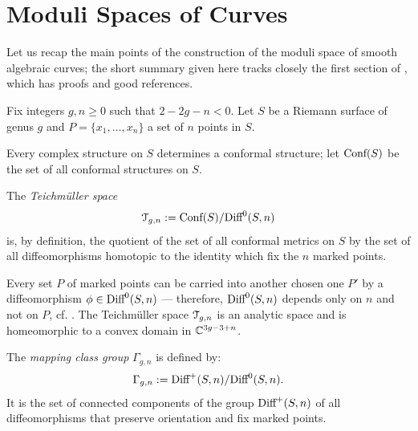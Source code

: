 \section{Moduli Spaces of Curves}
\label{sec:moduli-spaces}

Let us recap the main points of the construction of the moduli space
of smooth algebraic curves; the short summary given here tracks
closely the first section of \cite{looijenga;cellular-decomposition},
which has proofs and good references.

Fix integers $g,n\geq0$ such that $2 -2g - n < 0$. Let $S$ be a Riemann
surface of genus $g$ and $P = \{ x_1, \ldots, x_n \}$ a set of $n$ points
in $S$.

Every complex structure  on $S$ determines a conformal structure; let
$\text{\rm Conf}(S)$ be the set of all conformal structures on $S$. 
\begin{definition}\label{dfn:teichmuller}
  The \emph{Teichm{\"u}ller space}
  \begin{equation*}
    \mathcal{T}_{g,n} := \text{\rm Conf}(S) / \textrm{Diff}^0(S, n)
  \end{equation*}
  is, by definition, the quotient of the set of all conformal metrics on
  $S$ by the set of all diffeomorphisms homotopic to the identity which
  fix the $n$ marked points.
\end{definition}
Every set $P$ of marked points can be carried into another chosen one
$P'$ by a diffeomorphism $\phi \in \textrm{Diff}^0(S, n)$ --- therefore,
$\textrm{Diff}^0(S, n)$ depends only on $n$ and not on $P$, cf.
\cite{krushkal;riemann-surfaces}. The Teichm{\"u}ller space $\mathcal{T}_{g,n}$ is
an analytic space and is homeomorphic to a convex domain in $\mathbb{C}^{3g -
  3 + n}$.

\begin{definition}\label{dfn:mapping-class-group}
  The \emph{mapping class group} $\Gamma_{g,n}$ is defined by:
  \begin{equation*}
    \Gamma_{g,n} := \textrm{Diff}^+ (S, n) / \textrm{Diff}^0(S, n).
  \end{equation*}
  It is the set of connected components of the group $\textrm{Diff}^+(S, n)$ of
  all diffeomorphisms that preserve orientation and fix marked points.
\end{definition}

